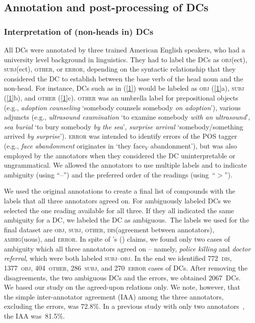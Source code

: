 \documentclass[output=paper]{langsci/langscibook}
\begin{document}
\subsection{Annotation and post-processing of DCs}\label{sec:annotation}\largerpage
\subsubsection{Interpretation of (non-heads in) DCs}\label{sec:annotation:relation}
All DCs were annotated by three trained American English speakers, who had a university level background in  linguistics. They had to label the DCs as \textsc{obj}(ect), \textsc{subj}(ect), \textsc{other}, or \textsc{error}, depending on the syntactic relationship that they considered the DC to establish between the base verb of the head noun and the non-head.
For instance, DCs such as in (\ref{1}) would be labeled as \textsc{obj} (\ref{1}a), \textsc{subj} (\ref{1}b), and \textsc{other} (\ref{1}c).
\textsc{other} was an umbrella label for prepositional objects (e.g., \textit{adoption counseling} \lq somebody counsels somebody \textit{on adoption}\rq), various adjuncts (e.g., \textit{ultrasound examination} \lq to examine somebody \textit{with an ultrasound}\rq, \textit{sea burial} \lq to bury somebody \textit{by the sea}\rq, \textit{surprise arrival} \lq somebody/something arrived \textit{by surprise}\rq).
\textsc{error} was  {intended} to identify errors of the POS tagger (e.g., \textit{face abandonment} originates in \lq they face$_V$ abandonment\rq), but was also employed by the annotators when they  considered the DC uninterpretable or  ungrammatical.
We allowed the annotators to use multiple labels and to indicate ambiguity (using \mbox{``--''}) and the preferred order of the readings (using~``$>$'').

We used the original annotations to create a final list of compounds with the labels that all three annotators agreed on. 
For ambiguously labeled DCs we selected the one reading available for all three. 
If they all indicated the same ambiguity for a DC, we labeled the DC as ambiguous.\ 
The labels we used for the final dataset are \textsc{obj}, \textsc{subj}, \textsc{other}, \textsc{dis}(agreement between annotators), \textsc{ambig}(uous), and \textsc{error}.
In spite of \citeauthor{borer:13}'s (\citeyear{borer:13}) claims, we found only two cases of ambiguity which all three annotators agreed on -- namely, \textit{police killing} and \textit{doctor referral}, which were both labeled \textsc{subj}--\textsc{obj}.
In the end we identified 772~\textsc{dis}, 1377~\textsc{obj}, 404~\textsc{other}, 286~\textsc{subj}, and 270~\textsc{error} cases of DCs.
After removing the disagreements, the two ambiguous DCs and the errors, we obtained 2067~DCs. We based our study on the agreed-upon relations only. We note, however, that the simple inter-annotator agreement (IAA) among the three annotators, excluding the errors, was 72.8\%. In a previous study with only two annotators~\citep{author:et:al:16}, the IAA was~81.5\%.
\end{document}
